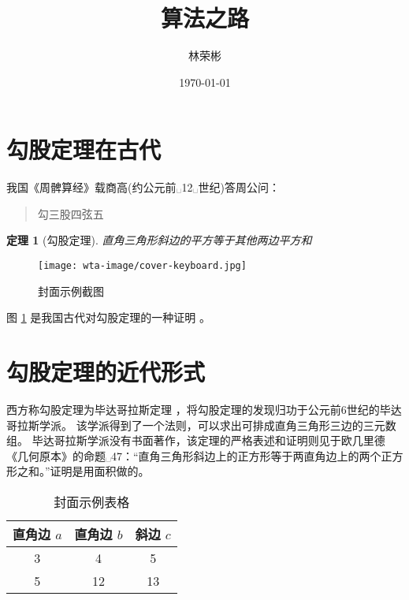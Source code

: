 \documentclass[12pt,a4paper,UTF8]{ctexart}
\title{算法之路}
\author{林荣彬}
\date{\today}
\newtheorem{theorem}{定理}
\begin{document}
\maketitle
\tableofcontents
\section{勾股定理在古代}

我国《周髀算经》载商高(约公元前␣12␣世纪)答周公问：
\begin{quote}
    勾三股四弦五
\end{quote}

\begin{theorem}[勾股定理]
    直角三角形斜边的平方等于其他两边平方和
\end{theorem}

\begin{figure}[ht]
    \centering
    \texttt{[image: wta-image/cover-keyboard.jpg]}
    \caption{封面示例截图}
    \label{fig:jietushili}
\end{figure}

图 \ref{fig:jietushili} 是我国古代对勾股定理的一种证明 \cite{IntroductionToAlgorithms} 。

\section{勾股定理的近代形式}

西方称勾股定理为毕达哥拉斯定理 \cite{IntroductionToAlgorithms}，将勾股定理的发现归功于公元前6世纪的毕达哥拉斯学派。
该学派得到了一个法则，可以求出可排成直角三角形三边的三元数组。
毕达哥拉斯学派没有书面著作，该定理的严格表述和证明则见于欧几里德《几何原本》的命题␣47：``直角三角形斜边上的正方形等于两直角边上的两个正方形之和。''证明是用面积做的。

\begin{table}[H]
    \centering
    \begin{tabular}{|ccc|}
        \hline
        直角边 $a$  &  直角边 $b$  &  斜边 $c$  \\
        \hline
        3 & 4 & 5   \\
        5 & 12 & 13 \\
        \hline
    \end{tabular}
    \caption{封面示例表格}
\end{table}


\end{document}
